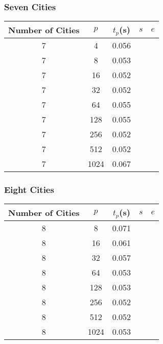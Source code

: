 \documentclass[12pt, letterpaper]{article}
\begin{document}
\subsubsection{Seven Cities}
\begin{center}
  \begin{tabular}{|c | c c c c ||}
    \hline
    Number of Cities & $p$ & $t_p$(s) & $s$ & $e$ \\
    \hline\hline
      7 & 4 &  0.056&  &  \\
      7 & 8 &  0.053&  &  \\
      7 & 16 & 0.052 &  &  \\
      7 & 32 & 0.052 &  &  \\
      7 & 64 & 0.055 &  &  \\
      7 & 128 &0.055  &  &  \\
      7 & 256 &0.052  &  &  \\
      7 & 512 &0.052  &  &  \\
      7 & 1024 & 0.067 &  &  \\
      \hline\hline
      \hline
  \end{tabular}
\end{center}
\subsubsection{Eight Cities}
\begin{center}
  \begin{tabular}{|c | c c c c ||}
    \hline
    Number of Cities & $p$ & $t_p$(s) & $s$ & $e$ \\
    \hline\hline
      8 & 8 &  0.071&  &  \\
      8 & 16 & 0.061 &  &  \\
      8 & 32 & 0.057 &  &  \\
      8 & 64 & 0.053 &  &  \\
      8 & 128 &0.053  &  &  \\
      8 & 256 &0.052  &  &  \\
      8 & 512 &0.052  &  &  \\
      8 & 1024 & 0.053 &  &  \\
      \hline\hline
      \hline
  \end{tabular}
\end{center}
\end{document}
